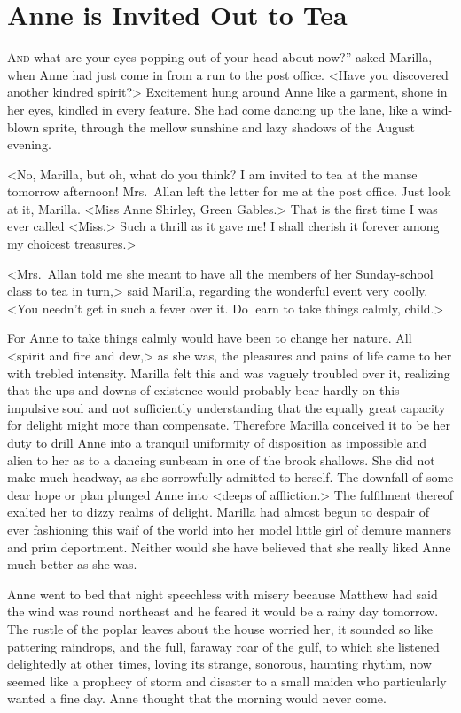 \chapter{Anne is Invited Out to Tea}

\lettrine[ante=“,]{A}{nd} what are your eyes popping out of your head about now?” asked Marilla, when Anne had just come in from a run to the post office. <Have you discovered another kindred spirit?> Excitement hung around Anne like a garment, shone in her eyes, kindled in every feature. She had come dancing up the lane, like a wind-blown sprite, through the mellow sunshine and lazy shadows of the August evening.

<No, Marilla, but oh, what do you think? I am invited to tea at the manse tomorrow afternoon! Mrs.~Allan left the letter for me at the post office. Just look at it, Marilla. <Miss Anne Shirley, Green Gables.> That is the first time I was ever called <Miss.> Such a thrill as it gave me! I shall cherish it forever among my choicest treasures.>

<Mrs.~Allan told me she meant to have all the members of her Sunday-school class to tea in turn,> said Marilla, regarding the wonderful event very coolly. <You needn't get in such a fever over it. Do learn to take things calmly, child.>

For Anne to take things calmly would have been to change her nature. All <spirit and fire and dew,> as she was, the pleasures and pains of life came to her with trebled intensity. Marilla felt this and was vaguely troubled over it, realizing that the ups and downs of existence would probably bear hardly on this impulsive soul and not sufficiently understanding that the equally great capacity for delight might more than compensate. Therefore Marilla conceived it to be her duty to drill Anne into a tranquil uniformity of disposition as impossible and alien to her as to a dancing sunbeam in one of the brook shallows. She did not make much headway, as she sorrowfully admitted to herself. The downfall of some dear hope or plan plunged Anne into <deeps of affliction.> The fulfilment thereof exalted her to dizzy realms of delight. Marilla had almost begun to despair of ever fashioning this waif of the world into her model little girl of demure manners and prim deportment. Neither would she have believed that she really liked Anne much better as she was.

Anne went to bed that night speechless with misery because Matthew had said the wind was round northeast and he feared it would be a rainy day tomorrow. The rustle of the poplar leaves about the house worried her, it sounded so like pattering raindrops, and the full, faraway roar of the gulf, to which she listened delightedly at other times, loving its strange, sonorous, haunting rhythm, now seemed like a prophecy of storm and disaster to a small maiden who particularly wanted a fine day. Anne thought that the morning would never come.

